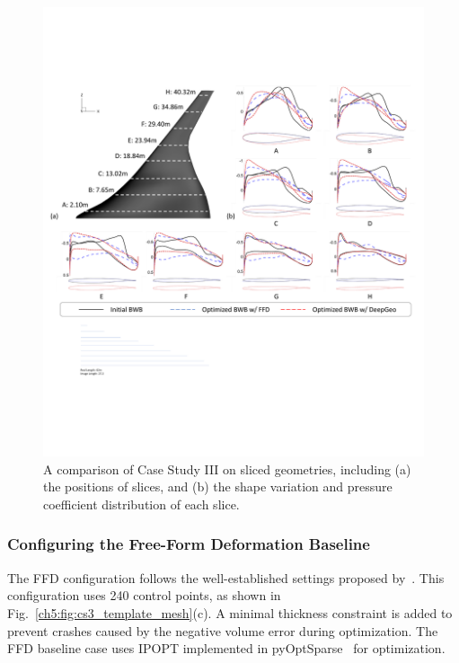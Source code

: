 \begin{figure}[!th]
    \vspace{2mm}
    \begin{center}
        \includegraphics[width=1\linewidth]{chapter5/fig/bwb_optim_slice.pdf}
    \end{center}
    \caption{
        \small A comparison of Case Study III on sliced geometries, including (a) the positions of slices, and (b) the shape variation and pressure coefficient distribution of each slice.
    }
    \label{ch5:fig:cs3_slice}
\end{figure}

\subsubsection{Configuring the Free-Form Deformation Baseline}

The FFD configuration follows the well-established settings proposed by~\citet{aa.Lyu2014}. This configuration uses 240 control points, as shown in Fig.~\ref{ch5:fig:cs3_template_mesh}(c). A minimal thickness constraint is added to prevent crashes caused by the negative volume error during optimization. The FFD baseline case uses IPOPT implemented in pyOptSparse~\cite{aa.Wu2020} for optimization.

